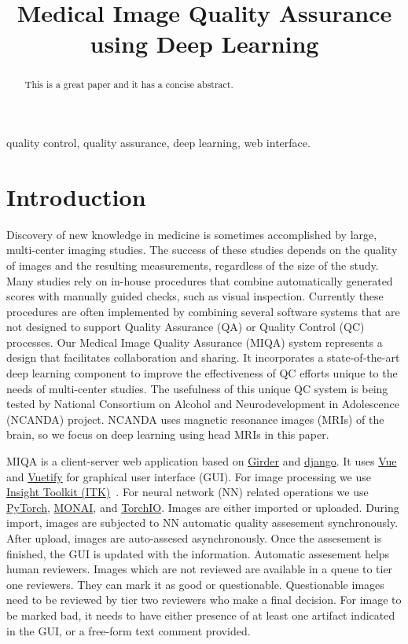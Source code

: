 \documentclass{midl} %
\title[Medical Image Quality Assurance using Deep Learning]{Medical Image Quality Assurance using Deep Learning}
\begin{document}
\maketitle

\begin{abstract}
This is a great paper and it has a concise abstract.
\end{abstract}

\begin{keywords}
quality control, quality assurance, deep learning, web interface.
\end{keywords}

\section{Introduction}

Discovery of new knowledge in medicine is sometimes accomplished by large, multi-center imaging studies. The success of these studies depends on the quality of images and the resulting measurements, regardless of the size of the study. Many studies rely on in-house procedures that combine automatically generated scores with manually guided checks, such as visual inspection. Currently these procedures are often implemented by combining several software systems that are not designed to support Quality Assurance (QA) or Quality Control (QC) processes. Our Medical Image Quality Assurance (MIQA) system represents a design that facilitates collaboration and sharing. It incorporates a state-of-the-art deep learning component to improve the effectiveness of QC efforts unique to the needs of multi-center studies. The usefulness of this unique QC system is being tested by National Consortium on Alcohol and Neurodevelopment in Adolescence (NCANDA) project. NCANDA uses magnetic resonance images (MRIs) of the brain, so we focus on deep learning using head MRIs in this paper.

MIQA is a client-server web application based on \href{https://github.com/girder/girder}{Girder} and \href{https://github.com/girder/girder}{django}. It uses \href{https://vuejs.org/}{Vue} and \href{https://vuetifyjs.com/}{Vuetify} for graphical user interface (GUI). For image processing we use \href{https://itk.org/}{Insight Toolkit (ITK)}~\cite{mccormick2014itk}. For neural network (NN) related operations we use \href{https://pytorch.org/}{PyTorch}, \href{https://monai.io/}{MONAI}, and \href{https://torchio.readthedocs.io/}{TorchIO}. Images are either imported or uploaded. During import, images are subjected to NN automatic quality assesement synchronously. After upload, images are auto-assesed asynchronously. Once the assesement is finished, the GUI is updated with the information. Automatic assesement helps human reviewers. Images which are not reviewed are available in a queue to tier one reviewers. They can mark it as good or questionable. Questionable images need to be reviewed by tier two reviewers who make a final decision. For image to be marked bad, it needs to have either presence of at least one artifact indicated in the GUI, or a free-form text comment provided.
\end{document}
